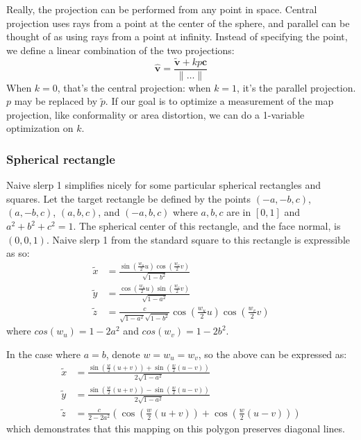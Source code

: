 \documentclass{amsart}[12pt]
\begin{document}
Really, the projection can be performed from any point in space. Central
projection uses rays from a point at the center of the sphere, and parallel can
be thought of as using rays from a point at infinity. Instead of specifying the
point, we define a linear combination of the two projections:
\begin{equation}
  \hat{\mathbf v} = \frac{\widetilde{\mathbf v} + kp\mathbf c}{\|\dots\|}
\end{equation}
When $k=0$, that's the central projection: when $k=1$, it's the parallel
projection. $p$ may be replaced by $\widetilde{p}$. If our goal is to optimize
a measurement of the map projection, like conformality or area distortion, we
can do a 1-variable optimization on $k$.

\subsubsection{Spherical rectangle}
Naive slerp 1 simplifies nicely for some particular spherical rectangles and
squares. Let the target rectangle be defined by the points $(-a,-b,c)$,
$(a,-b,c)$, $(a,b,c)$, and $(-a,b,c)$ where $a, b, c$ are in $[0,1]$ and
$a^2 + b^2 + c^2 = 1$. The spherical center of this rectangle, and the face
normal, is $(0,0,1)$. Naive slerp 1 from the standard square to this rectangle
is expressible as so:
\begin{equation}\begin{split}
  \widetilde{x} &= \frac{\sin(\frac{w_u}{2}u) \cos(\frac{w_v}{2}v) }
    {\sqrt{1-b^2}}\\
  \widetilde{y} &= \frac{\cos(\frac{w_u}{2}u) \sin(\frac{w_v}{2}v) }
    {\sqrt{1-a^2}}\\
  \widetilde{z} &=\frac{c}{\sqrt{1-a^2}\sqrt{1-b^2}}
    \cos(\frac{w_u}{2}u) \cos(\frac{w_v}{2}v)
\end{split}\end{equation}
where $cos(w_u) = 1 - 2 a^2$ and $cos(w_v) = 1 - 2 b^2$.

In the case where $a=b$, denote $w = w_u = w_v$,
so the above can be expressed as:
\begin{equation}\begin{split}
  \widetilde{x} &= \frac{\sin\left(\frac{w}{2}(u+v)\right) +
    \sin\left(\frac{w}{2}(u-v)\right)}
    {2\sqrt{1-a^2}}\\
  \widetilde{y} &= \frac{\sin\left(\frac{w}{2}(u+v)\right) -
    \sin\left(\frac{w}{2}(u-v)\right)}
    {2\sqrt{1-a^2}}\\
  \widetilde{z} &=\frac{c}{2-2a^2}\left(\cos\left(\frac{w}{2}(u+v)\right) +
    \cos\left(\frac{w}{2}(u-v)\right)\right)
\end{split}\end{equation}
which demonstrates that this mapping on this polygon preserves diagonal lines.
\end{document}
